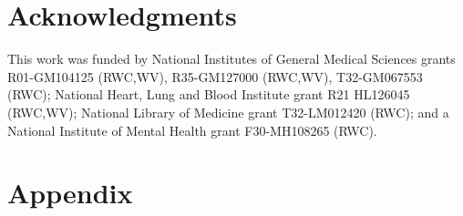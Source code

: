 \documentclass[9pt,twocolumn,twoside]{gsag3jnl}
\begin{document}
\section{Acknowledgments}
This work was funded by National Institutes of General Medical Sciences grants R01-GM104125 (RWC,WV), R35-GM127000 (RWC,WV), T32-GM067553 (RWC); National Heart, Lung and Blood Institute grant R21 HL126045 (RWC,WV); National Library of Medicine grant T32-LM012420 (RWC); and a National Institute of Mental Health grant F30-MH108265 (RWC).




\clearpage
\newpage
\section*{Appendix}

\setcounter{figure}{0}
\renewcommand{\thefigure}{A\arabic{figure}}
\end{document}
